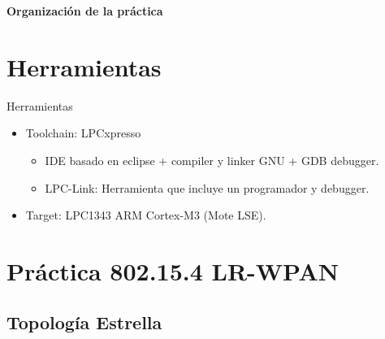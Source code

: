 \documentclass[aspectratio=169, handout]{beamer}
\begin{document}

\begin{frame}{\textbf{Organización de la práctica}}
  \tableofcontents
\end{frame}
%
%
\section[Herramientas]{Herramientas}
\begin{frame}[c]{Herramientas}
    \begin{itemize}

        \item Toolchain: LPCxpresso
            \begin{itemize}
            \item IDE basado en eclipse + compiler y linker GNU + GDB debugger.
            \vspace{10px}
            \item LPC-Link: Herramienta que incluye un programador y debugger.
            \vspace{10px}   
            \end{itemize}
        \item Target: LPC1343 ARM Cortex-M3 (Mote LSE).
        \vspace{10px}
    \end{itemize}
\end{frame}

%
\section{Práctica 802.15.4 LR-WPAN}

\subsection[Estrella]{Topología Estrella}
\end{document}
